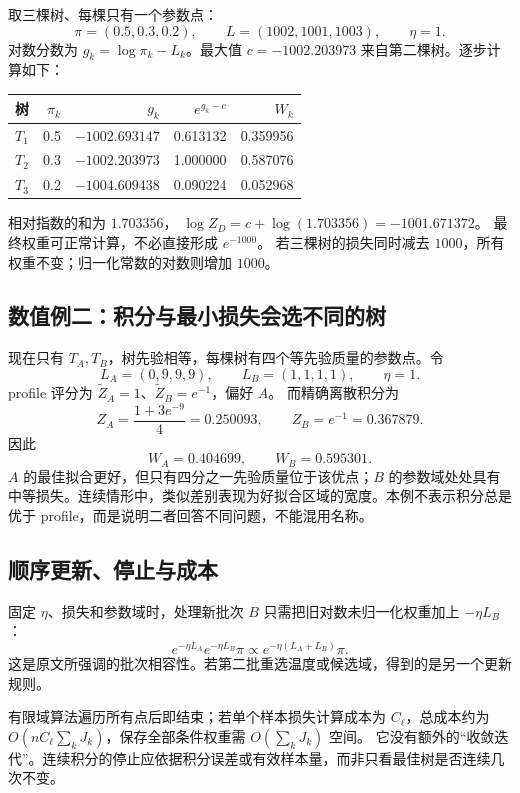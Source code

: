 取三棵树、每棵只有一个参数点：
\[
 \pi=(0.5,0.3,0.2),\qquad L=(1002,1001,1003),\qquad\eta=1.
\]
对数分数为 $g_k=\log\pi_k-L_k$。最大值
$c=-1002.203973$ 来自第二棵树。逐步计算如下：
\begin{center}
\begin{tabular}{lrrrr}
\toprule
树 & $\pi_k$ & $g_k$ & $e^{g_k-c}$ & $W_k$\\
\midrule
$T_1$ & 0.5 & $-1002.693147$ & 0.613132 & 0.359956\\
$T_2$ & 0.3 & $-1002.203973$ & 1.000000 & 0.587076\\
$T_3$ & 0.2 & $-1004.609438$ & 0.090224 & 0.052968\\
\bottomrule
\end{tabular}
\end{center}
相对指数的和为 $1.703356$，
$\log Z_D=c+\log(1.703356)=-1001.671372$。
最终权重可正常计算，不必直接形成 $e^{-1000}$。
若三棵树的损失同时减去 $1000$，所有权重不变；归一化常数的对数则增加 $1000$。

\subsection{数值例二：积分与最小损失会选不同的树}

现在只有 $T_A,T_B$，树先验相等，每棵树有四个等先验质量的参数点。令
\[
 L_A=(0,9,9,9),\qquad L_B=(1,1,1,1),\qquad\eta=1.
\]
profile 评分为 $\widetilde Z_A=1$、$\widetilde Z_B=e^{-1}$，偏好 $A$。
而精确离散积分为
\[
 Z_A=\frac{1+3e^{-9}}4=0.250093,\qquad
 Z_B=e^{-1}=0.367879.
\]
因此
\[
 W_A=0.404699,\qquad W_B=0.595301.
\]
$A$ 的最佳拟合更好，但只有四分之一先验质量位于该优点；$B$ 的参数域处处具有中等损失。连续情形中，类似差别表现为好拟合区域的宽度。本例不表示积分总是优于 profile，而是说明二者回答不同问题，不能混用名称。

\subsection{顺序更新、停止与成本}

固定 $\eta$、损失和参数域时，处理新批次 $B$ 只需把旧对数未归一化权重加上 $-\eta L_B$：
\[
 e^{-\eta L_A}e^{-\eta L_B}\pi
 \propto e^{-\eta(L_A+L_B)}\pi.
\]
这是原文所强调的批次相容性。若第二批重选温度或候选域，得到的是另一个更新规则。

有限域算法遍历所有点后即结束；若单个样本损失计算成本为 $C_\ell$，总成本约为
$O(nC_\ell\sum_kJ_k)$，保存全部条件权重需 $O(\sum_kJ_k)$ 空间。
它没有额外的“收敛迭代”。连续积分的停止应依据积分误差或有效样本量，而非只看最佳树是否连续几次不变。

